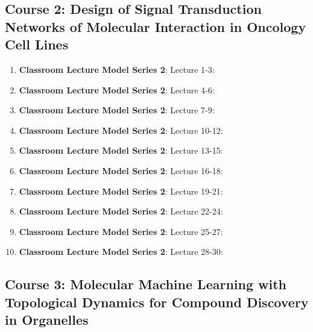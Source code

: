\documentclass{ResumeDesignFormat1}
\begin{document}
\subsection{Course 2: Design of Signal Transduction Networks of Molecular Interaction in Oncology Cell Lines}

\begin{enumerate}
\item \textbf{Classroom Lecture Model Series 2}: \textcolor{c1}{Lecture 1-3:}
\item \textbf{Classroom Lecture Model Series 2}: \textcolor{c1}{Lecture 4-6:}
\item \textbf{Classroom Lecture Model Series 2}: \textcolor{c1}{Lecture 7-9:}
\item \textbf{Classroom Lecture Model Series 2}: \textcolor{c1}{Lecture 10-12:}
\item \textbf{Classroom Lecture Model Series 2}: \textcolor{c1}{Lecture 13-15:}
\item \textbf{Classroom Lecture Model Series 2}: \textcolor{c1}{Lecture 16-18:}
\item \textbf{Classroom Lecture Model Series 2}: \textcolor{c1}{Lecture 19-21:}
\item \textbf{Classroom Lecture Model Series 2}: \textcolor{c1}{Lecture 22-24:}
\item \textbf{Classroom Lecture Model Series 2}: \textcolor{c1}{Lecture 25-27:}
\item \textbf{Classroom Lecture Model Series 2}: \textcolor{c1}{Lecture 28-30:}
\end{enumerate}

\subsection{Course 3: Molecular Machine Learning with Topological Dynamics for Compound Discovery in Organelles}
\end{document}
